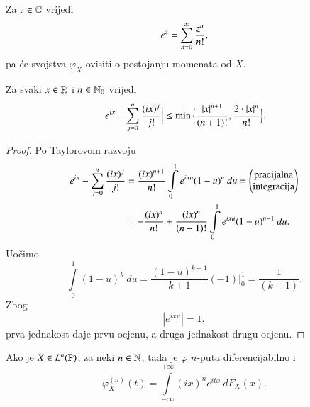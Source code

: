 Za $z \in \mathbb{C}$ vrijedi
\begin{equation*}
    e^z = \sum\limits_{n = 0}^{\infty} \frac{z^n}{n !},
\end{equation*}
pa \' ce svojstva $\varphi_X$ ovisiti o postojanju momenata od $X$.

\begin{lm}  \label{lm:17.5}
    Za svaki $x \in \mathbb{R}$ i $n \in \mathbb{N}_0$ vrijedi
    \begin{equation*}
        \Big| e^{ix} - \sum\limits_{j = 0}^{n} \frac{(ix)^j}{j !} \Big| \leq \min \Big\{ \frac{|x|^{n + 1}}{(n + 1)!}, \frac{2 \cdot |x|^n}{n !} \Big\}.
    \end{equation*}
\end{lm}

\begin{proof}
    Po Taylorovom razvoju
    \begin{equation*}
        \begin{aligned}
            e^{ix} - \sum\limits_{j = 0}^{n} \frac{(i x)^j}{j !} &= \frac{(i x)^{n + 1}}{n !} \int\limits_0^1 e^{i x u} (1 - u)^n \: du =
            \begin{pmatrix}
                \textnormal{pracijalna}\\
                \textnormal{integracija}
            \end{pmatrix}\\
            &= - \frac{(ix)^n}{n !} + \frac{(i x)^n}{(n - 1) !} \int\limits_0^1 e^{i x u} (1 - u)^{n - 1} \: d u.
        \end{aligned}
    \end{equation*}
    Uo\v cimo
    \begin{equation*}
        \int\limits_0^1 (1 - u)^k \: d u = \frac{(1 - u)^{k + 1}}{k + 1} (-1) \Bigg|_0^1 = \frac{1}{(k + 1)}.
    \end{equation*}
    Zbog
    \begin{equation*}
        |e^{ixu}| = 1,
    \end{equation*}
    prva jednakost daje prvu ocjenu, a druga jednakost drugu ocjenu.
\end{proof}

\begin{lm}  \label{lm:17.6}
    Ako je $X \in L^n (\mathbb{P})$, za neki $n \in \mathbb{N}$, tada je $\varphi$ $n$-puta diferencijabilno i
    \begin{equation*}
        \varphi_X^{(n)} (t) = \int\limits_{-\infty}^{+\infty} (i x)^n e^{i t x} \: d F_X (x).
    \end{equation*}
\end{lm}


